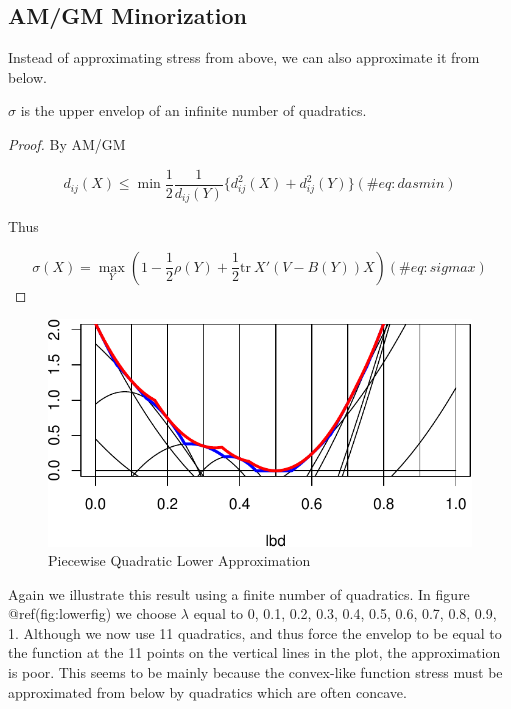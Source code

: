 \documentclass[
  12pt,
  letterpaper,
  DIV=11,
  numbers=noendperiod]{scrreprt}
\theoremstyle{remark}
\begin{document}
\subsection{AM/GM Minorization}\label{propamgmmin}

Instead of approximating stress from above, we can also approximate it
from below.

\label{uplowenv}
\(\sigma\) is the upper envelop of an infinite number of quadratics.

\begin{proof}
By AM/GM

\begin{equation}
d_{ij}(X)\leq\min
\frac12\frac{1}{d_{ij}(Y)}\{d_{ij}^2(X)+d_{ij}^2(Y)\}
(\#eq:dasmin)
\end{equation}

Thus

\begin{equation}
\sigma(X)=\max_Y \left(1-\frac12\rho(Y)+\frac12\text{tr}\ X'(V-B(Y))X\right)
(\#eq:sigmax)
\end{equation}
\end{proof}

\begin{figure}[H]

{\centering \includegraphics{minimization_files/figure-pdf/lowerfig-1.pdf}

}

\caption{Piecewise Quadratic Lower Approximation}

\end{figure}%

Again we illustrate this result using a finite number of quadratics. In
figure @ref(fig:lowerfig) we choose \(\lambda\) equal to 0, 0.1, 0.2,
0.3, 0.4, 0.5, 0.6, 0.7, 0.8, 0.9, 1. Although we now use 11 quadratics,
and thus force the envelop to be equal to the function at the 11 points
on the vertical lines in the plot, the approximation is poor. This seems
to be mainly because the convex-like function stress must be
approximated from below by quadratics which are often concave.
\end{document}
